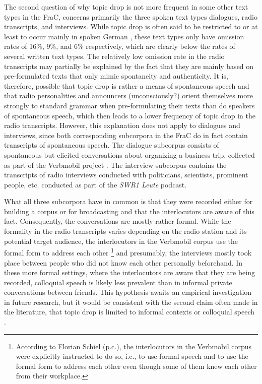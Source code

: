 \largerpage
The second question of why topic drop is not more frequent in some other text types in the FraC, concerns primarily the three spoken text types dialogues, radio transcripts, and interviews.
While topic drop is often said to be restricted to or at least to occur mainly in spoken German \citep{huang1984,cardinaletti1990,poitou1993,jaensch2005,dittmann.etal2007,volodina2011, volodina.onea2012}, these text types only have omission rates of 16\%, 9\%, and 6\% respectively, which are clearly below the rates of several written text types.
The relatively low omission rate in the radio transcripts may partially be explained by the fact that they are mainly based on pre-formulated texts that only mimic spontaneity and authenticity.
It is, therefore, possible that topic drop is rather a means of spontaneous speech and that radio personalities and announcers (unconsciously?) orient themselves more strongly to standard grammar when pre-formulating their texts than do speakers of spontaneous speech, which then leads to a lower frequency of topic drop in the radio transcripts.
However, this explanation does not apply to dialogues and interviews, since both corresponding subcorpora in the FraC do in fact contain transcripts of spontaneous speech.
The dialogue subcorpus consists of spontaneous but elicited conversations about organizing a business trip, collected as part of the Verbmobil project \citep{burger.etal2000}.
The interview subcorpus contains the transcripts of radio interviews conducted with politicians, scientists, prominent people, etc. conducted as part of the \textit{SWR1 Leute} podcast.

What all three subcorpora have in common is that they were recorded either for building a corpus or for broadcasting and that the interlocutors are aware of this fact.
Consequently, the conversations are mostly rather formal.
While the formality in the radio transcripts varies depending on the radio station and its potential target audience, the interlocutors in the Verbmobil corpus use the formal form to address each other%
\footnote{According to Florian Schiel (p.c.), the interlocutors in the Verbmobil corpus were explicitly instructed to do so, i.e., to use formal speech and to use the formal form to address each other even though some of them knew each other from their workplace.}
%
and presumably, the interviews mostly took place between people who did not know each other personally beforehand.
In these more formal settings, where the interlocutors are aware that they are being recorded, colloquial speech is likely less prevalent than in informal private conversations between friends.
This hypothesis awaits an empirical investigation in future research, but it would be consistent with the second claim often made in the literature, that topic drop is limited to informal contexts or colloquial speech \citep{huang1984,poitou1993,jaensch2005,volodina.onea2012,trutkowski2016}.

